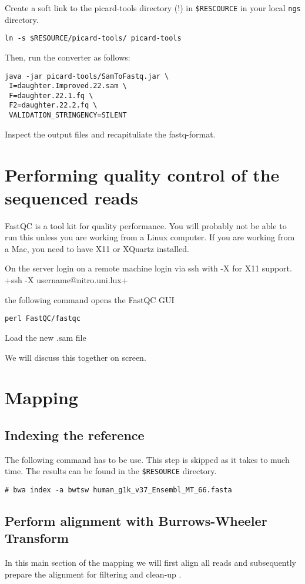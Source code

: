 \documentclass{article}
\begin{document}
Create a soft link to the picard-tools directory (!) in \verb+$RESCOURCE+ in your local \verb+ngs+ directory. 
\begin{verbatim}
ln -s $RESOURCE/picard-tools/ picard-tools
\end{verbatim}


Then, run the converter as follows:

\begin{verbatim}
java -jar picard-tools/SamToFastq.jar \
 I=daughter.Improved.22.sam \
 F=daughter.22.1.fq \
 F2=daughter.22.2.fq \
 VALIDATION_STRINGENCY=SILENT
\end{verbatim}

Inspect the output files and recapituliate the fastq-format.

\section{Performing quality control of the sequenced reads}
FastQC is a tool kit for quality performance. You will probably not be able to run 
this unless you are working from a Linux computer. 
If you are working from a Mac, you need to have X11 or XQuartz installed.

On the server login on a remote machine login via ssh with -X for X11 support.
\mint{bash}+ssh -X username@nitro.uni.lux+

the following command opens the FastQC GUI
\begin{verbatim}
perl FastQC/fastqc
\end{verbatim}

Load the new .sam file

We will discuss this together on screen. 

\section{Mapping}
\subsection{Indexing the reference }
The following command has to be use. This step is skipped as it takes to much time. The results can be found
in the \verb+$RESOURCE+ directory.
\begin{verbatim}
# bwa index -a bwtsw human_g1k_v37_Ensembl_MT_66.fasta
\end{verbatim}



\subsection{Perform alignment with Burrows-Wheeler Transform} 
In this main section of the mapping we will first align all reads and subsequently 
prepare the alignment for filtering and clean-up .
\end{document}
